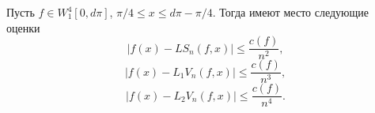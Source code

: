 \begin{corollary}\label{cor}
  Пусть $f\in W_1^{4}[0,d\pi]$, $\pi/4\le x\le d\pi-\pi/4$. Тогда имеют место следующие оценки
  $$
  |f(x)-LS_n(f,x)|\le \frac{c(f)}{n^2},
  $$
$$
  |f(x)-L_1V_n(f,x)|\le \frac{c(f)}{n^3},
  $$
$$
  |f(x)-L_2V_n(f,x)|\le \frac{c(f)}{n^4}.
  $$
\end{corollary}




